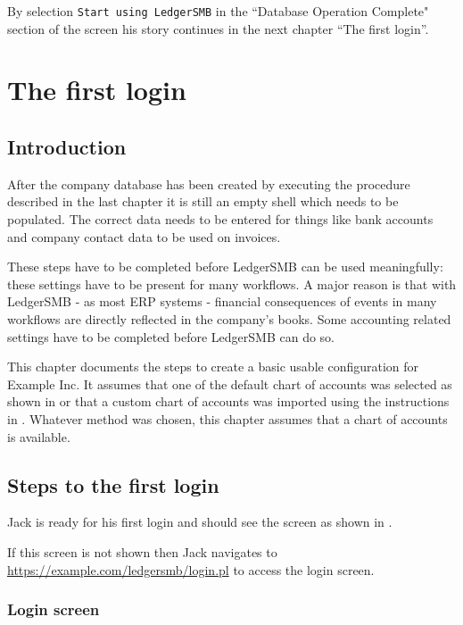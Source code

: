 By selection \texttt{Start using LedgerSMB} in the ``Database Operation Complete" section of the screen his story continues in
the next chapter ``The first login''.

\chapter{The first login}
\label{cha-first-login}

\section{Introduction}
\label{sec-first-login-introduction}

After the company database has been created by executing the procedure described in the last
chapter it is still an empty shell which needs to be populated. The correct data
needs to be entered for things like bank accounts and company contact data to be used
on invoices.

These steps have to be completed before LedgerSMB can be used meaningfully: these
settings have to be present for many workflows. A major reason is that with LedgerSMB
- as most ERP systems - financial
consequences of events in many workflows are directly reflected in the company's books.
Some accounting related settings have to be completed before LedgerSMB can do so.

This chapter documents the steps to create a basic usable configuration for Example Inc. 
It assumes that
one of the default chart of accounts was selected as shown in  or 
that a custom chart of accounts was imported using the instructions in . 
Whatever method was chosen, this chapter assumes that a chart of accounts is available.

\section{Steps to the first login}
\label{sec-first-login-ramp-up}

Jack is ready for his first login and should see the screen as shown in .

If this screen is not shown then Jack navigates to 
\url{https://example.com/ledgersmb/login.pl} to access the login screen.

\subsection{Login screen}
\label{subsec-first-login-screen}

